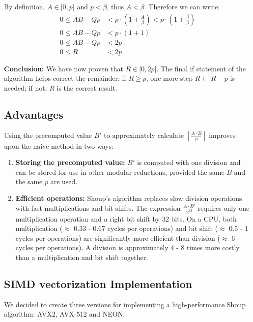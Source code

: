 \documentclass{article}
\begin{document}
By definition, $A \in [0, p[$ and $p < \beta$, thus $A < \beta$. Therefore we can write:
\begin{align*}
    0 \le AB - Qp & < p \cdot (1 + \frac{A}{\beta}) < p\cdot (1 + \frac{\beta}{\beta}) \\
    0 \le AB - Qp & < p \cdot (1 + 1)                                                  \\
    0 \le AB - Qp & < 2p                                                               \\
    0 \le R       & < 2p
\end{align*}

\textbf{Conclusion:}
We have now proven that $R \in [0, 2p[$. The final if statement of the algorithm helps correct the remainder: if $R \ge p$, one more step $R\leftarrow R - p$ is needed; if not, $R$ is the correct result.


\subsection{Advantages}
Using the precomputed value $B'$ to approximately calculate $\left\lfloor \frac{A \cdot B}{p} \right\rfloor$ improves upon the naive method in two ways:
\begin{enumerate}
    \item \textbf{Storing the precomputed value:}
          $B'$ is computed with one division and can be stored for use in other modular reductions, provided the same $B$ and the same $p$ are used.
    \item \textbf{Efficient operations:}
          Shoup's algorithm replaces slow division operations with fast multiplications and bit shifts. The expression $\frac{A \cdot B'}{2^{32}}$ requires only one multiplication operation and a right bit shift by 32 bits. On a CPU, both multiplication ($\approx$ 0.33 - 0.67 cycles per operations) and bit shift ($\approx$ 0.5 - 1 cycles per operations) are significantly more efficient than division ($\approx$ 6 cycles per operations). A division is approximately 4 - 8 times more costly than a multiplication and bit shift together.
\end{enumerate}


\subsection{SIMD vectorization Implementation}
We decided to create three versions for implementing a high-performance Shoup algorithm: AVX2, AVX-512 and NEON.
\end{document}
